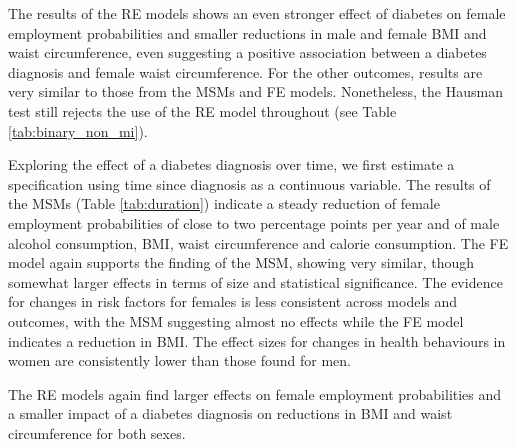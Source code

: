 The results of the \ac{RE} models shows an even stronger effect of diabetes on female employment probabilities and  smaller reductions in male and female \ac{BMI} and waist circumference, even suggesting a positive association between a diabetes diagnosis and female waist circumference. For the other outcomes, results are very similar to those from the \acp{MSM} and \ac{FE} models. Nonetheless, the Hausman test still rejects the use of the \ac{RE} model throughout (see Table \ref{tab:binary_non_mi}).

Exploring the effect of a diabetes diagnosis over time, we first estimate a specification using time since diagnosis as a continuous variable. The results of the \acp{MSM} (Table \ref{tab:duration}) indicate a steady reduction of female employment probabilities of close to two percentage points per year and of male alcohol consumption, \ac{BMI}, waist circumference and calorie consumption. The \ac{FE} model again supports the finding of the \ac{MSM}, showing very similar, though somewhat larger effects in terms of size and statistical significance. The evidence for changes in risk factors for females is less consistent across models and outcomes, with the \ac{MSM} suggesting almost no effects while the \ac{FE} model indicates a reduction in \ac{BMI}. The effect sizes for changes in health behaviours in women are consistently lower than those found for men. 

The \ac{RE} models again find larger effects on female employment probabilities and a smaller impact of a diabetes diagnosis on reductions in \ac{BMI} and waist circumference for both sexes. 


